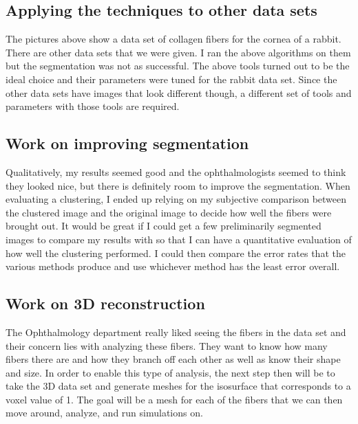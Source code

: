 \documentclass[11pt,psfig]{article}
\begin{document}
\subsection{Applying the techniques to other data sets}

The pictures above show a data set of collagen fibers for the cornea of a rabbit. There are other data sets that we were given. I ran the above algorithms on them but the segmentation was not as successful. The above tools turned out to be the ideal choice and their parameters were tuned for the rabbit data set. Since the other data sets have images that look different though, a different set of tools and parameters with those tools are required. 

\subsection{Work on improving segmentation}

Qualitatively, my results seemed good and the ophthalmologists seemed to think they looked nice, but there is definitely room to improve the segmentation. When evaluating a clustering, I ended up relying on my subjective comparison between the clustered image and the original image to decide how well the fibers were brought out. It would be great if I could get a few preliminarily segmented images to compare my results with so that I can have a quantitative evaluation of how well the clustering performed. I could then compare the error rates that the various methods produce and use whichever method has the least error overall. 

\subsection{Work on 3D reconstruction}

The Ophthalmology department really liked seeing the fibers in the data set and their concern lies with analyzing these fibers. They want to know how many fibers there are and how they branch off each other as well as know their shape and size. In order to enable this type of analysis, the next step then will be to take the 3D data set and generate meshes for the isosurface that corresponds to a voxel value of 1. The goal will be a mesh for each of the fibers that we can then move around, analyze, and run simulations on.  
\end{document}
